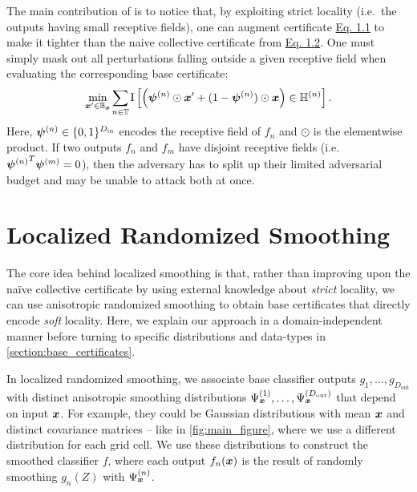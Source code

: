 \documentclass{article} %
\theoremstyle{plain}
\theoremstyle{definition}
\theoremstyle{remark}
\begin{document}
The main contribution of \citet{Schuchardt2021} is to notice that, by exploiting strict locality (i.e.\ the outputs having small receptive fields), one can augment certificate \hyperref[eq:recipe]{Eq. 1.1} to make it  tighter than the naive collective certificate from \hyperref[eq:recipe]{Eq. 1.2}.
One must simply mask out all perturbations falling outside a given receptive field when evaluating the corresponding base certificate:
\begin{equation*}
	\min_{\vx' \in \sB_\vx} \smashoperator{\sum_{n \in \sT}} \mathrm{I}\left[
	\left( \vpsi^{(n)} \odot \vx' + (1 - \vpsi^{(n)}) \odot \vx  \right) \in \sH^{(n)}
	\right].
\end{equation*}
Here, ${\bm{\psi}}^{(n)} \in \{0,1\}^{D_\mathrm{in}}$ encodes the receptive field
of $f_n$ and $\odot$ is the elementwise product.
If two outputs $f_n$ and $f_m$ have disjoint receptive fields (i.e.\ ${{\bm{\psi}}^{(n)}}^T {\bm{\psi}}^{(m)} = 0$), then the adversary has to split up their  limited adversarial budget and may be unable to attack both at once.

\section{Localized Randomized Smoothing}\label{section:localized_randomized_smoothing}
The core idea behind localized smoothing is that, rather than
improving upon the na\"ive collective certificate by 
using external knowledge about \textit{strict} locality,
we can use anisotropic randomized smoothing to obtain base certificates that directly encode \textit{soft} locality.
Here, we explain our approach in a domain-independent manner 
before turning to specific distributions and data-types in \autoref{section:base_certificates}.

In localized randomized smoothing, we associate base classifier outputs $g_1, \dots, g_{D_\mathrm{out}}$
with distinct anisotropic
smoothing distributions $\Psi^{(1)}_{\bm{x}}, \dots, \Psi^{(D_\mathrm{out})}_{\bm{x}}$
that depend on input ${\bm{x}}$.
For example, they could be
Gaussian distributions with mean ${\bm{x}}$ and distinct covariance matrices -- like in \autoref{fig:main_figure}, where we use a different distribution for
each grid cell. 
We
use these distributions to construct the smoothed classifier $f$, where each output $f_n({\bm{x}})$ is the result of randomly smoothing $g_n(Z)$ with $\Psi_{\bm{x}}^{(n)}$. 
\end{document}
